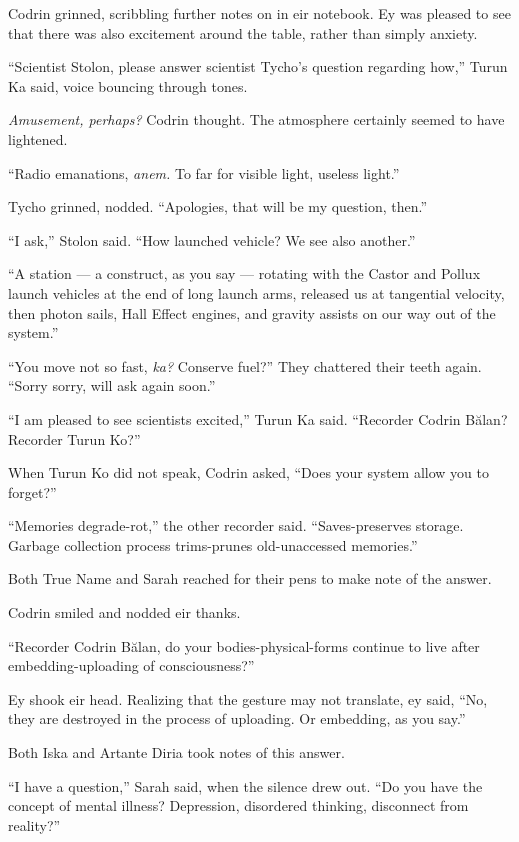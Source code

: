 Codrin grinned, scribbling further notes on in eir notebook. Ey was pleased to see that there was also excitement around the table, rather than simply anxiety.

``Scientist Stolon, please answer scientist Tycho's question regarding how,'' Turun Ka said, voice bouncing through tones.

\emph{Amusement, perhaps?} Codrin thought. The atmosphere certainly seemed to have lightened.

``Radio emanations, \emph{anem.} To far for visible light, useless light.''

Tycho grinned, nodded. ``Apologies, that will be my question, then.''

``I ask,'' Stolon said. ``How launched vehicle? We see also another.''

``A station — a construct, as you say — rotating with the Castor and Pollux launch vehicles at the end of long launch arms, released us at tangential velocity, then photon sails, Hall Effect engines, and gravity assists on our way out of the system.''

``You move not so fast, \emph{ka?} Conserve fuel?'' They chattered their teeth again. ``Sorry sorry, will ask again soon.''

``I am pleased to see scientists excited,'' Turun Ka said. ``Recorder Codrin Bălan? Recorder Turun Ko?''

When Turun Ko did not speak, Codrin asked, ``Does your system allow you to forget?''

``Memories degrade-rot,'' the other recorder said. ``Saves-preserves storage. Garbage collection process trims-prunes old-unaccessed memories.''

Both True Name and Sarah reached for their pens to make note of the answer.

Codrin smiled and nodded eir thanks.

``Recorder Codrin Bălan, do your bodies-physical-forms continue to live after embedding-uploading of consciousness?''

Ey shook eir head. Realizing that the gesture may not translate, ey said, ``No, they are destroyed in the process of uploading. Or embedding, as you say.''

Both Iska and Artante Diria took notes of this answer.

``I have a question,'' Sarah said, when the silence drew out. ``Do you have the concept of mental illness? Depression, disordered thinking, disconnect from reality?''

